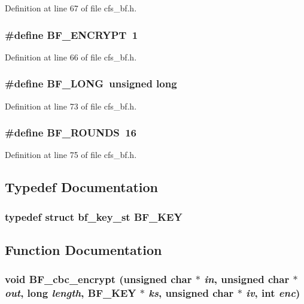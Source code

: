 Definition at line 67 of file cfs\_\-bf.h.
\subsubsection{\setlength{\rightskip}{0pt plus 5cm}\#define BF\_\-ENCRYPT\ 1}\label{cfs__bf_8h_a0}




Definition at line 66 of file cfs\_\-bf.h.
\subsubsection{\setlength{\rightskip}{0pt plus 5cm}\#define BF\_\-LONG\ unsigned long}\label{cfs__bf_8h_a2}




Definition at line 73 of file cfs\_\-bf.h.
\subsubsection{\setlength{\rightskip}{0pt plus 5cm}\#define BF\_\-ROUNDS\ 16}\label{cfs__bf_8h_a3}




Definition at line 75 of file cfs\_\-bf.h.

\subsection{Typedef Documentation}
\subsubsection{\setlength{\rightskip}{0pt plus 5cm}typedef struct {\bf bf\_\-key\_\-st}  {\bf BF\_\-KEY}}\label{cfs__bf_8h_a5}




\subsection{Function Documentation}
\subsubsection{\setlength{\rightskip}{0pt plus 5cm}void BF\_\-cbc\_\-encrypt (unsigned char $\ast$ {\em in}, unsigned char $\ast$ {\em out}, long {\em length}, {\bf BF\_\-KEY} $\ast$ {\em ks}, unsigned char $\ast$ {\em iv}, int {\em enc})}\label{cfs__bf_8h_a9}


